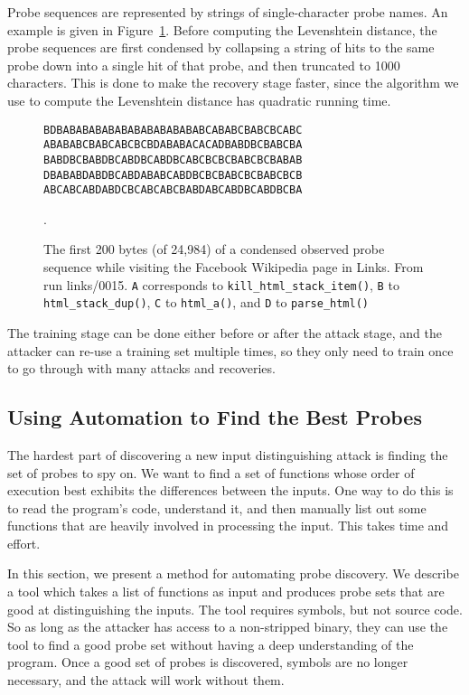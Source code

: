 \documentclass[letterpaper,twocolumn,10pt]{article}
\begin{document}
Probe sequences are represented by strings of single-character probe names. An
example is given in Figure~\ref{figure:probetext}. Before computing the
Levenshtein distance, the probe sequences are first condensed by collapsing
a string of hits to the same probe down into a single hit of that probe, and
then truncated to 1000 characters. This is done to make the recovery stage
faster, since the algorithm we use to compute the Levenshtein distance has
quadratic running time.

\begin{figure}
    \centering
\begin{verbatim}
BDBABABABABABABABABABABABCABABCBABCBCABC
ABABABCBABCABCBCBDABABACACADBABDBCBABCBA
BABDBCBABDBCABDBCABDBCABCBCBCBABCBCBABAB
DBABABDABDBCABDABABCABDBCBCBABCBCBABCBCB
ABCABCABDABDCBCABCABCBABDABCABDBCABDBCBA
\end{verbatim}
\caption{The first 200 bytes (of 24,984) of a condensed observed probe sequence
    while visiting the Facebook Wikipedia page in Links. From run links/0015.
    \texttt{A} corresponds to \texttt{kill\_html\_stack\_item()}, \texttt{B} to
    \texttt{html\_stack\_dup()}, \texttt{C} to \texttt{html\_a()}, and
\texttt{D} to \texttt{parse\_html()}}. \label{figure:probetext}
\end{figure}

The training stage can be done either before or after the attack stage, and the
attacker can re-use a training set multiple times, so they only need to train
once to go through with many attacks and recoveries.

\subsection{Using Automation to Find the Best Probes}
\label{sec:automate}

The hardest part of discovering a new input distinguishing attack is finding the
set of probes to spy on. We want to find a set of functions whose order of
execution best exhibits the differences between the inputs. One way to do this
is to read the program's code, understand it, and then manually list out some
functions that are heavily involved in processing the input. This takes time and
effort. 

In this section, we present a method for automating probe discovery. We describe
a tool which takes a list of functions as input and produces probe sets that are
good at distinguishing the inputs. The tool requires symbols, but not source
code. So as long as the attacker has access to a non-stripped binary, they can
use the tool to find a good probe set without having a deep understanding of the
program. Once a good set of probes is discovered, symbols are no longer
necessary, and the attack will work without them.
\end{document}
